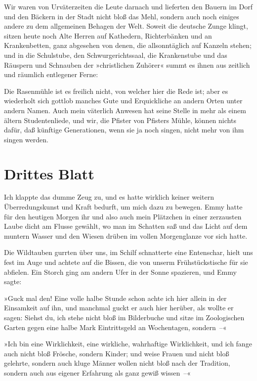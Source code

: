 Wir waren von Urväterzeiten die Leute darnach und lieferten den
Bauern im Dorf und den Bäckern in der Stadt nicht bloß das Mehl,
sondern auch noch einiges andere zu dem allgemeinen Behagen der
Welt. Soweit die deutsche Zunge klingt, sitzen heute noch Alte
Herren auf Kathedern, Richterbänken und an Krankenbetten, ganz
abgesehen von denen, die allsonntäglich auf Kanzeln stehen; und in
die Schulstube, den Schwurgerichtssaal, die Krankenstube und das
Räuspern und Schnauben der »christlichen Zuhörer« summt es ihnen
aus zeitlich und räumlich entlegener Ferne:

Die Rasenmühle ist es freilich nicht, von welcher hier die Rede
ist; aber es wiederholt sich gottlob manches Gute und Erquickliche
an andern Orten unter andern Namen. Auch mein väterlich Anwesen hat
seine Stelle in mehr als einem ältern Studentenliede, und wir, die
Pfister von Pfisters Mühle, können nichts dafür, daß künftige
Generationen, wenn sie ja noch singen, nicht mehr von ihm singen
werden.

\section{Drittes Blatt}

Ich klappte das dumme Zeug zu, und es hatte wirklich keiner weitern
Überredungskunst und Kraft bedurft, um mich dazu zu bewegen. Emmy
hatte für den heutigen Morgen ihr und also auch mein Plätzchen in
einer zerzausten Laube dicht am Flusse gewählt, wo man im Schatten
saß und das Licht auf dem muntern Wasser und den Wiesen drüben im
vollen Morgenglanze vor sich hatte.

Die Wildtauben gurrten über uns, im Schilf schnatterte eine
Entenschar, hielt uns fest im Auge und achtete auf die Bissen, die
von unserm Frühstückstische für sie abfielen. Ein Storch ging am
andern Ufer in der Sonne spazieren, und Emmy sagte:

»Guck mal den! Eine volle halbe Stunde schon achte ich hier allein
in der Einsamkeit auf ihn, und manchmal guckt er auch hier herüber,
als wollte er sagen: Siehst du, ich stehe nicht bloß im Bilderbuche
und sitze im Zoologischen Garten gegen eine halbe Mark
Eintrittsgeld an Wochentagen, sondern~–«

»Ich bin eine Wirklichkeit, eine wirkliche, wahrhaftige
Wirklichkeit, und ich fange auch nicht bloß Frösche, sondern
Kinder; und weise Frauen und nicht bloß gelehrte, sondern auch
kluge Männer wollen nicht bloß nach der Tradition, sondern auch aus
eigener Erfahrung als ganz gewiß wissen~–«

